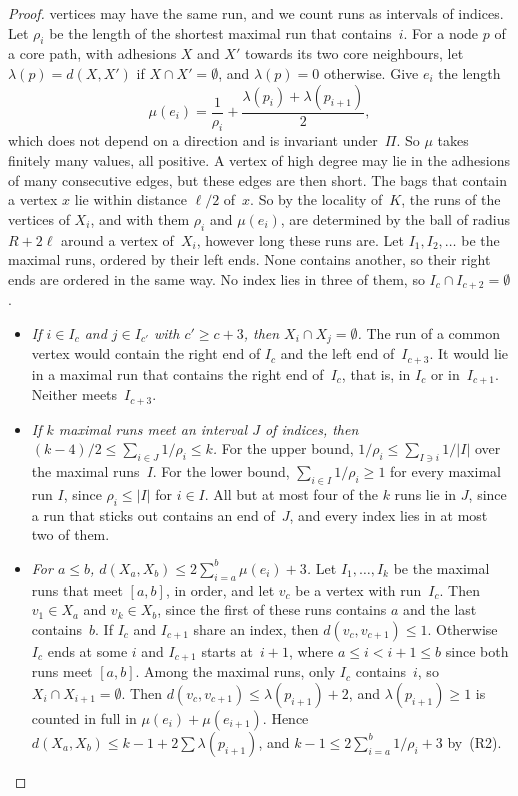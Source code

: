 \documentclass[11pt]{article}
\theoremstyle{remark}
\begin{document}
\begin{proof}
vertices may have the same run, and we count runs as intervals of indices. Let
$\rho_i$ be the length of the shortest maximal run that contains~$i$. For a node $p$ of a core path,
with adhesions $X$ and $X'$ towards its two core neighbours, let $\lambda(p)=d(X,X')$ if
$X\cap X'=\emptyset$, and $\lambda(p)=0$ otherwise. Give $e_i$ the length
\[
  \mu(e_i)=\frac1{\rho_i}+\frac{\lambda(p_i)+\lambda(p_{i+1})}2,
\]
which does not depend on a direction and is invariant under~$\Pi$. So $\mu$ takes finitely many
values, all positive. A vertex of high degree may lie in the adhesions of many consecutive edges, but
these edges are then short. The bags that contain a vertex $x$ lie within distance $\ell/2$ of~$x$.
So by the locality of~$K$, the runs of the vertices of $X_i$, and with them $\rho_i$ and $\mu(e_i)$,
are determined by the ball of radius $R+2\ell$ around a vertex of~$X_i$, however long these runs are. Let $I_1,I_2,\dots$ be the
maximal runs, ordered by their left ends. None contains another, so
their right ends are ordered in the same way. No index lies in three of them, so
$I_c\cap I_{c+2}=\emptyset$.
\begin{itemize}
\item[(R1)] \emph{If $i\in I_c$ and $j\in I_{c'}$ with $c'\ge c+3$, then $X_i\cap X_j=\emptyset$.} The run
  of a common vertex would contain the right end of $I_c$ and the left end of~$I_{c+3}$. It would lie
  in a maximal run that contains the right end of~$I_c$, that is, in $I_c$ or in~$I_{c+1}$. Neither
  meets~$I_{c+3}$.
\item[(R2)] \emph{If $k$ maximal runs meet an interval $J$ of indices, then
  $(k-4)/2\le\sum_{i\in J}1/\rho_i\le k$.} For the upper bound, $1/\rho_i\le\sum_{I\ni i}1/|I|$ over the
  maximal runs~$I$. For the lower bound, $\sum_{i\in I}1/\rho_i\ge1$ for every maximal run $I$, since
  $\rho_i\le|I|$ for $i\in I$. All but at most four of the $k$ runs lie in $J$, since a run that sticks
  out contains an end of~$J$, and every index lies in at most two of them.
\item[(R3)] \emph{For $a\le b$, $d(X_a,X_b)\le2\sum_{i=a}^b\mu(e_i)+3$.} Let $I_1,\dots,I_k$ be the
  maximal runs that meet $[a,b]$, in order, and let $v_c$ be a vertex with run~$I_c$. Then
  $v_1\in X_a$ and $v_k\in X_b$, since the first of these runs contains $a$ and the last contains~$b$. If $I_c$ and $I_{c+1}$ share an index, then $d(v_c,v_{c+1})\le1$.
  Otherwise $I_c$ ends at some $i$ and $I_{c+1}$ starts at~$i+1$, where $a\le i<i+1\le b$ since both
  runs meet $[a,b]$. Among the maximal runs, only $I_c$
  contains~$i$, so $X_i\cap X_{i+1}=\emptyset$. Then $d(v_c,v_{c+1})\le\lambda(p_{i+1})+2$, and
  $\lambda(p_{i+1})\ge1$ is counted in full in $\mu(e_i)+\mu(e_{i+1})$. Hence
  $d(X_a,X_b)\le k-1+2\sum\lambda(p_{i+1})$, and $k-1\le2\sum_{i=a}^b1/\rho_i+3$ by~(R2).
\end{itemize}


\end{proof}
\end{document}
